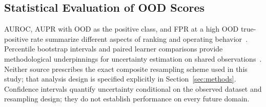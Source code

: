 \subsection{Statistical Evaluation of OOD Scores}

AUROC, AUPR with OOD as the positive class, and FPR at a high OOD true-positive rate summarize different aspects of ranking and operating behavior~\cite{hendrycks2017baseline,liang2018enhancing}. Percentile bootstrap intervals and paired learner comparisons provide methodological underpinnings for uncertainty estimation on shared observations~\cite{efron1993bootstrap,dietterich1998approximate}. Neither source prescribes the exact composite resampling scheme used in this study; that analysis design is specified explicitly in Section~\ref{sec:methods}. Confidence intervals quantify uncertainty conditional on the observed dataset and resampling design; they do not establish performance on every future domain.
